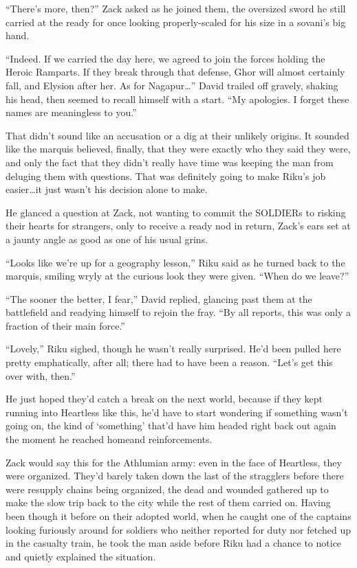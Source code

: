 ``There's more, then?'' Zack asked as he joined them, the oversized sword he still carried at the ready for once looking properly-scaled for his size in a sovani's big hand.

``Indeed. If we carried the day here, we agreed to join the forces holding the Heroic Ramparts. If they break through that defense, Ghor will almost certainly fall, and Elysion after her. As for Nagapur\ldots'' David trailed off gravely, shaking his head, then seemed to recall himself with a start. ``My apologies. I forget these names are meaningless to you.''

That didn't sound like an accusation or a dig at their unlikely origins. It sounded like the marquis believed, finally, that they were exactly who they said they were, and only the fact that they didn't really have time was keeping the man from deluging them with questions. That was definitely going to make Riku's job easier\ldots it just wasn't his decision alone to make.

He glanced a question at Zack, not wanting to commit the SOLDIERs to risking their hearts for strangers, only to receive a ready nod in return, Zack's ears set at a jaunty angle as good as one of his usual grins.

``Looks like we're up for a geography lesson,'' Riku said as he turned back to the marquis, smiling wryly at the curious look they were given. ``When do we leave?''

``The sooner the better, I fear,'' David replied, glancing past them at the battlefield and readying himself to rejoin the fray. ``By all reports, this was only a fraction of their main force.''

``Lovely,'' Riku sighed, though he wasn't really surprised. He'd been pulled here pretty emphatically, after all; there had to have been a reason. ``Let's get this over with, then.''

He just hoped they'd catch a break on the next world, because if they kept running into Heartless like this, he'd have to start wondering if something wasn't going on, the kind of `something' that'd have him headed right back out again the moment he reached home\textemdash and reinforcements.


\scenechange


Zack would say this for the Athlumian army: even in the face of Heartless, they were organized. They'd barely taken down the last of the stragglers before there were resupply chains being organized, the dead and wounded gathered up to make the slow trip back to the city while the rest of them carried on. Having been though it before on their adopted world, when he caught one of the captains looking furiously around for soldiers who neither reported for duty nor fetched up in the casualty train, he took the man aside before Riku had a chance to notice and quietly explained the situation.

